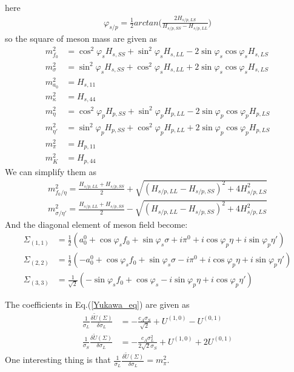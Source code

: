 \documentclass[12pt]{article}
\begin{document}
here
\begin{align}
\varphi_{s/p}=\frac{1}{2} arctan\Bigg(\frac{2H_{s/p,LS}}{H_{s/p,SS}-H_{s/p,LL}}\Bigg)
\end{align}
so the square of meson mass are given as
\begin{align}
m_{f_0}^2&=\cos^2\varphi_s H_{s,SS}+\sin^2 \varphi_s H_{s,LL}-2 \sin \varphi_s \cos \varphi_s H_{s,LS}\\
m_{\sigma}^2&=\sin^2\varphi_s H_{s,SS}+\cos^2 \varphi_s H_{s,LL}+2 \sin \varphi_s \cos \varphi_s H_{s,LS}\\
m_{a_0}^2&=H_{s,11}\\
m_{\kappa}^2&=H_{s,44}\\
m_{\eta}^2&=\cos^2\varphi_p H_{p,SS}+\sin^2 \varphi_p H_{p,LL}-2 \sin \varphi_p \cos \varphi_p H_{p,LS}\\
m_{\eta'}^2&=\sin^2\varphi_p H_{p,SS}+\cos^2 \varphi_p H_{p,LL}+2 \sin \varphi_p \cos \varphi_p H_{p,LS}\\
m_{\pi}^2&=H_{p,11}\\
m_{K}^2&=H_{p,44}
\end{align}
We can simplify them as
 \begin{align}
m_{f_0/\eta}^2=\frac{H_{s/p,LL}+H_{s/p,SS}}{2}+\sqrt{(H_{s/p,LL}-H_{s/p,SS})^2+4 H_{s/p,LS}^2}\\
m_{\sigma/\eta'}^2=\frac{H_{s/p,LL}+H_{s/p,SS}}{2}-\sqrt{(H_{s/p,LL}-H_{s/p,SS})^2+4 H_{s/p,LS}^2}
\end{align}
And the diagonal element of meson field become:
\begin{align}
\Sigma_{(1,1)}&=\frac{1}{2}(a_0^0+\cos\varphi_s f_0+\sin\varphi_s \sigma+i\pi^0 + i \cos\varphi_p \eta+i\sin\varphi_p \eta')\\
\Sigma_{(2,2)}&=\frac{1}{2}(- a_0^0+\cos\varphi_s f_0+\sin\varphi_s \sigma - i\pi^0  + i\cos\varphi_p \eta+i\sin\varphi_p \eta')\\
\Sigma_{(3,3)}&= \frac{1}{\sqrt{2} }(-\sin\varphi_s f_0 +\cos\varphi_s -i \sin\varphi_p\eta +i \cos\varphi_p \eta')
\end{align}

The coefficients in Eq.(\ref{Yukawa_eq}) are given as
\begin{align}
\frac{1}{\sigma_L} \frac{\delta \tilde U(\Sigma)}{\delta \sigma_L}&=- \frac{c_A \sigma_S}{\sqrt{2}} +U^{(1,0)} -U^{(0,1)}\\
\frac{1}{\sigma_S} \frac{\delta \tilde U(\Sigma)}{\delta \sigma_L}&=- \frac{c_A \sigma_L^2}{2 \sqrt{2} \sigma_S}+U^{(1,0)} +2 U^{(0,1)} 
\end{align}
One interesting thing is that  $\frac{1}{\sigma_L} \frac{\delta \tilde U(\Sigma)}{\delta \sigma_L}=m_\pi^2$.
\end{document}
